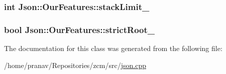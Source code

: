 \subsubsection[{\texorpdfstring{stack\+Limit\+\_\+}{stackLimit_}}]{\setlength{\rightskip}{0pt plus 5cm}int Json\+::\+Our\+Features\+::stack\+Limit\+\_\+}\hypertarget{classJson_1_1OurFeatures_a9a786713902d14be6d57a08cc03ccfff}{}\label{classJson_1_1OurFeatures_a9a786713902d14be6d57a08cc03ccfff}
\subsubsection[{\texorpdfstring{strict\+Root\+\_\+}{strictRoot_}}]{\setlength{\rightskip}{0pt plus 5cm}bool Json\+::\+Our\+Features\+::strict\+Root\+\_\+}\hypertarget{classJson_1_1OurFeatures_a2095f66a776c0a4ae6cc931a0c94242e}{}\label{classJson_1_1OurFeatures_a2095f66a776c0a4ae6cc931a0c94242e}


The documentation for this class was generated from the following file\+:\begin{DoxyCompactItemize}
\item 
/home/pranav/\+Repositories/zcm/src/\hyperlink{json_8cpp}{json.\+cpp}\end{DoxyCompactItemize}
